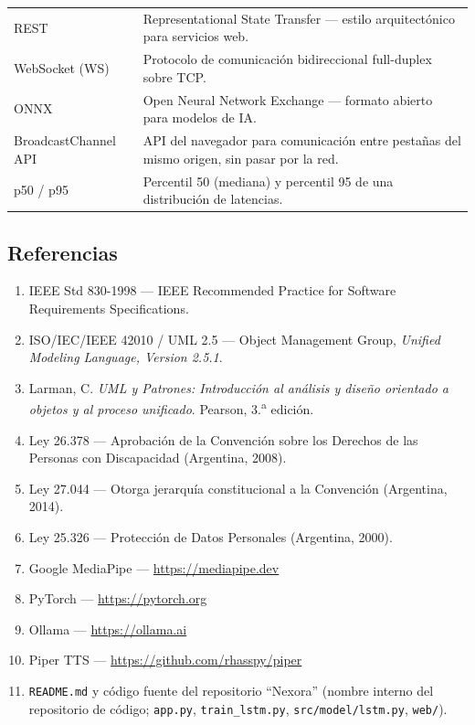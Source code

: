 \begin{longtable}{p{4cm} p{10cm}}
    REST & Representational State Transfer --- estilo arquitectónico para servicios web. \\
    WebSocket (WS) & Protocolo de comunicación bidireccional full-duplex sobre TCP. \\
    ONNX & Open Neural Network Exchange --- formato abierto para modelos de IA. \\
    BroadcastChannel API & API del navegador para comunicación entre pestañas del mismo origen, sin pasar por la red. \\
    p50 / p95 & Percentil 50 (mediana) y percentil 95 de una distribución de latencias. \\
    \bottomrule
\end{longtable}

\subsection{Referencias}

\begin{enumerate}
    \item IEEE Std 830-1998 --- IEEE Recommended Practice for Software Requirements Specifications.
    \item ISO/IEC/IEEE 42010 / UML 2.5 --- Object Management Group, \textit{Unified Modeling Language, Version 2.5.1}.
    \item Larman, C. \textit{UML y Patrones: Introducción al análisis y diseño orientado a objetos y al proceso unificado}. Pearson, 3.\textsuperscript{a} edición.
    \item Ley 26.378 --- Aprobación de la Convención sobre los Derechos de las Personas con Discapacidad (Argentina, 2008).
    \item Ley 27.044 --- Otorga jerarquía constitucional a la Convención (Argentina, 2014).
    \item Ley 25.326 --- Protección de Datos Personales (Argentina, 2000).
    \item Google MediaPipe --- \url{https://mediapipe.dev}
    \item PyTorch --- \url{https://pytorch.org}
    \item Ollama --- \url{https://ollama.ai}
    \item Piper TTS --- \url{https://github.com/rhasspy/piper}
    \item \texttt{README.md} y código fuente del repositorio ``Nexora'' (nombre interno del repositorio de código; \texttt{app.py}, \texttt{train\_lstm.py}, \texttt{src/\allowbreak model/\allowbreak lstm.py}, \texttt{web/}).
\end{enumerate}

